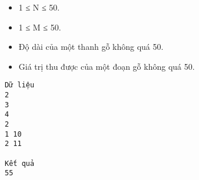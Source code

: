 \begin{itemize}
	\item     1 ≤ N ≤ 50.   
	\item     1 ≤ M ≤ 50.   
	\item     Độ dài của một thanh gỗ không quá 50.   
	\item     Giá trị thu được của một đoạn gỗ không quá 50.   
\end{itemize}
\begin{verbatim}
Dữ liệu
2
3
4
2
1 10
2 11

Kết quả
55
\end{verbatim}
